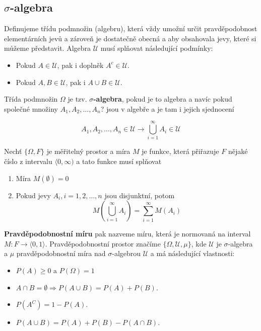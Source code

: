 \subsection{$\sigma$-algebra}
Definujeme třídu podmnožin (algebru), která vždy umožní určit pravděpodobnost elementárních jevů a zároveň je dostatečně obecná a aby obsahovala jevy, které si můžeme představit. Algebra $\mathscr{U}$ musí splňovat následující podmínky:

\begin{itemize}[noitemsep]
\item Pokud $A\in\mathscr{U}$, pak i doplněk $A^c\in\mathscr{U}$.
\item Pokud $A,B\in\mathscr{U}$, pak i $A\cup B\in\mathscr{U}$.
\end{itemize}

Třída podmnožin $\Omega$ je tzv. \textbf{$\sigma$-algebra}, pokud je to algebra a navíc pokud společné množiny $A_1,A_2,\ldots, A_n$? jsou v algebře a je tam i jejich sjednocení

\[ A_1,A_2,\ldots,A_n\in\mathscr{U}\to\bigcup_{i=1}^\infty A_i\in\mathscr{U} \]

Nechť $\{\Omega, F\}$ je měřitelný prostor a míra $M$ je funkce, která přiřazuje $F$ nějaké číslo z intervalu $\langle 0, \infty)$ a tato funkce musí splňovat

\begin{enumerate}[label=\alph*)]
\item Míra $M(\emptyset)=0$
\item Pokud jevy $A_i, i=1,2,\ldots,n$ jsou disjunktní, potom
\[ M\left(\bigcup_{i=1}^\infty A_i\right) = \sum_{i=1}^\infty M(A_i) \]
\end{enumerate}

\textbf{Pravděpodobnostní míru} pak nazveme míru, která je normovaná na interval $M:F\to\langle 0, 1\rangle$. Pravděpodobnostní prostor značíme $\{\Omega, \mathscr{U},\mu\}$, kde $\mathscr{U}$ je $\sigma$-algebra a $\mu$ pravděpodobnostní míra nad $\sigma$-algebrou $\mathscr{U}$ a má následující vlastnosti:

\begin{itemize}[noitemsep]
\item $P(A)\geq 0$ a $P(\Omega)=1$
\item $A\cap B = \emptyset \Rightarrow P(A\cup B) = P(A) + P(B)$.
\item $P(A^C) = 1-P(A)$.
\item $P(A\cup B) = P(A)+P(B)-P(A\cap B)$.
\end{itemize}

